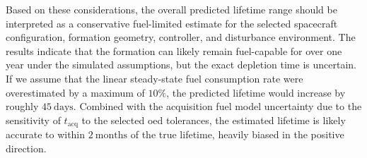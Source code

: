 Based on these considerations, the overall predicted lifetime range should be interpreted as a conservative fuel-limited estimate for the selected spacecraft configuration, formation geometry, controller, and disturbance environment. The results indicate that the formation can likely remain fuel-capable for over one year under the simulated assumptions, but the exact depletion time is uncertain. If we assume that the linear steady-state fuel consumption rate were overestimated by a maximum of $10\%$, the predicted lifetime would increase by roughly $45~\mathrm{days}$. Combined with the acquisition fuel model uncertainty due to the sensitivity of $t_{\mathrm{acq}}$ to the selected \gls{oed} tolerances, the estimated lifetime is likely accurate to within $2~\mathrm{months}$ of the true lifetime, heavily biased in the positive direction.

